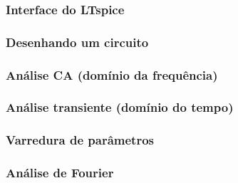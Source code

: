 \documentclass{beamer}
\begin{document}
\begin{frame}
\frametitle{Interface do LTspice}
\end{frame}

\begin{frame}
\frametitle{Desenhando um circuito}
\end{frame}

\begin{frame}
\frametitle{Análise CA (domínio da frequência)}
\end{frame}

\begin{frame}
\frametitle{Análise transiente (domínio do tempo)}
\end{frame}

\begin{frame}
\frametitle{Varredura de parâmetros}
\end{frame}

\begin{frame}
\frametitle{Análise de Fourier}
\end{frame}

\end{document}
